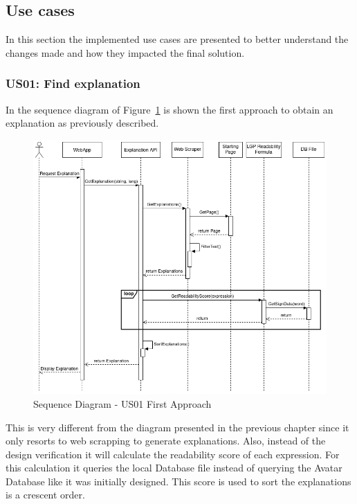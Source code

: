 \subsection{Use cases}

In this section the implemented use cases are presented to better understand the changes made and how they impacted the final solution.

\subsubsection{US01: Find explanation}

In the sequence diagram of Figure~\ref{fig:uc01Imp1} is shown the first approach to obtain an explanation as previously described.

\begin{figure}[H]
\centering
\includegraphics[scale=0.45]{ch5/assets/US01_SD_Implement_Ap1.png}
\caption[Sequence Diagram US01 First Approach]{Sequence Diagram - US01 First Approach}
\label{fig:uc01Imp1}
\end{figure}

This is very different from the diagram presented in the previous chapter since it only resorts to web scrapping to generate explanations.
Also, instead of the design verification it will calculate the readability score of each expression.
For this calculation it queries the local Database file instead of querying the Avatar Database like it was initially designed.
This score is used to sort the explanations is a crescent order.

